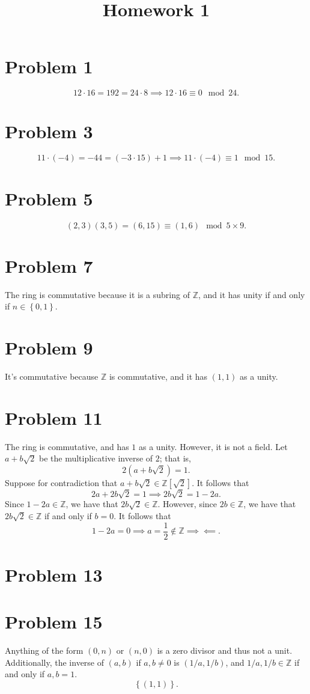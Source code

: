 \documentclass[11pt, letterpaper]{article}
\title{Homework 1}
\begin{document}
\makeproblem
\section*{Problem 1}
\[
	12\cdot 16=192=24\cdot 8 \implies 12\cdot 16 \equiv 0 \mod{24}
.\]
\section*{Problem 3}
\[
	11\cdot (-4)=-44=(-3\cdot 15)+1 \implies 11\cdot (-4)\equiv 1\mod{15} 
.\]
\section*{Problem 5}
\[
	(2,3)(3,5)=(6,15)\equiv (1,6)\mod{5\times 9} 
.\]
\section*{Problem 7}
The ring is commutative because it is a subring of $\mathbb{Z}$, and it has unity if and only if $n\in \left\{ 0,1 \right\} $.
\section*{Problem 9}
It's commutative because $\mathbb{Z}$ is commutative, and it has $(1,1)$ as a unity.
\section*{Problem 11}
The ring is commutative, and has $1$ as a unity. However, it is not a field. Let $a+b\sqrt{2} $ be the multiplicative inverse of $2$; that is,
\[
	2\left( a+b\sqrt{2}  \right) =1
.\]
Suppose for contradiction that $a+b\sqrt{2} \in \mathbb{Z}\left[ \sqrt{2}  \right] $. It follows that
\[
	2a+2b\sqrt{2} =1 \implies 2b\sqrt{2} =1-2a
.\]
Since $1-2a\in\mathbb{Z}$, we have that $2b\sqrt{2} \in\mathbb{Z}$. However, since $2b\in\mathbb{Z}$, we have that $2b\sqrt{2} \in\mathbb{Z}$ if and only if $b=0$. It follows that
\[
	1-2a=0 \implies a=\frac{1}{2}\notin \mathbb{Z} \implies \impliedby 
.\]
\section*{Problem 13}

\section*{Problem 15}
Anything of the form $(0,n)$ or $(n,0)$ is a zero divisor and thus not a unit. Additionally, the inverse of $(a,b)$ if $a,b\neq 0$ is $(1 /a,1 /b)$, and $1/a, 1 /b\in\mathbb{Z}$ if and only if $a,b=1$.
\[
	\left\{ (1,1) \right\} 
.\]
\end{document}
